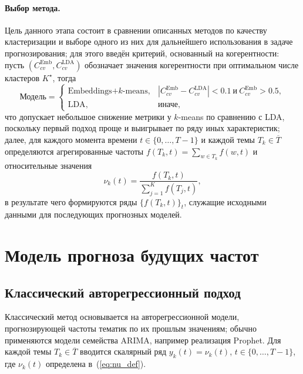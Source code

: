 \documentclass[14pt,a4paper]{article}
\begin{document}
\paragraph{Выбор метода.}
Цель данного этапа состоит в сравнении описанных методов по качеству кластеризации и выборе одного из них для дальнейшего использования в задаче прогнозирования; для этого введён критерий, основанный на когерентности: пусть $(C_{cv}^{\mathrm{Emb}},C_{cv}^{\mathrm{LDA}})$ обозначает значения когерентности при оптимальном числе кластеров $K^{\star}$, тогда
\[
\text{Модель}= 
\begin{cases}
\text{Embeddings+$k$-means}, & |C_{cv}^{\mathrm{Emb}}-C_{cv}^{\mathrm{LDA}}|<0.1\ \text{и}\ C_{cv}^{\mathrm{Emb}}>0.5,\\[4pt]
\text{LDA}, & \text{иначе},
\end{cases}
\]
что допускает небольшое снижение метрики у $k$-means по сравнению с LDA, поскольку первый подход проще и выигрывает по ряду иных характеристик; далее, для каждого момента времени $t\in\{0,\dots,T-1\}$ и каждой темы $T_k\in\overline{T}$ определяются агрегированные частоты $f(T_k,t)=\sum_{w\in T_k}f(w,t)$ и относительные значения
\[
\nu_k(t)=\frac{f(T_k,t)}{\sum_{j=1}^{K}f(T_j,t)},\label{eq:nu_def}
\]
в результате чего формируются ряды $\{f(T_k,t)\}_t$, служащие исходными данными для последующих прогнозных моделей.

\newpage
\section{Модель прогноза будущих частот}
\subsection{Классический авторегрессионный подход}\label{ssec:classic}
Классический метод основывается на авторегрессионной модели, прогнозирующей частоты тематик по их прошлым значениям; обычно применяются модели семейства ARIMA, например реализация Prophet. Для каждой темы $T_k\in\overline{T}$ вводится скалярный ряд $y_k(t)=\nu_k(t)$, $t\in\{0,\dots,T-1\}$, где $\nu_k(t)$ определена в~(\ref{eq:nu_def}).
\end{document}
